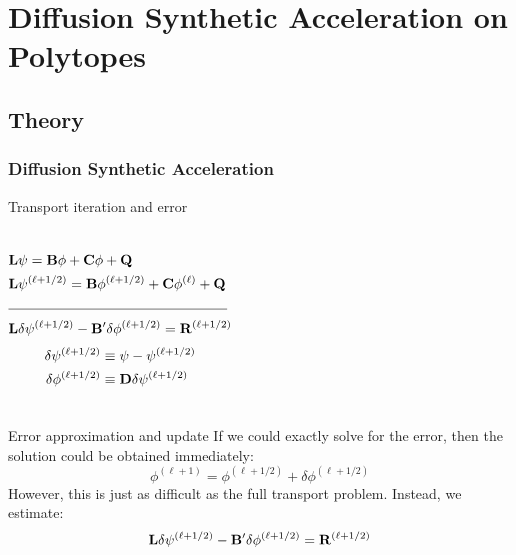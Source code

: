 \documentclass[compress,10pt]{beamer}
\begin{document}
\section[DSA on Polytopes]{Diffusion Synthetic Acceleration on Polytopes}
\subsection{Theory}
\typeout{***********************************************************************************}
\begin{frame}[t]\frametitle{Diffusion Synthetic Acceleration}
\begin{block}{Transport iteration and error}{\small
\begin{columns}
\begin{equation*}
\begin{aligned}
&{\bf L} \psi = {\bf B} \phi + {\bf C} \phi + {\bf Q} \\
&{\bf L} \psi^{(\ell+1/2)} = {\bf B} \phi^{(\ell+1/2)} + {\bf C} \phi^{(\ell)} + {\bf Q} \\
&\noindent\rule{5.5cm}{0.4pt} \\
&{\bf L} \delta \psi^{(\ell+1/2)} - {\bf B}' \delta \phi^{(\ell+1/2)} = {\bf R}^{(\ell+1/2)}
\end{aligned}
\end{equation*}
\begin{equation*}
\begin{aligned}
\delta \psi^{(\ell+1/2)} &\equiv \psi - \psi^{(\ell+1/2)} \\
\delta \phi^{(\ell+1/2)} &\equiv {\bf D} \delta \psi^{(\ell+1/2)}
\end{aligned}
\end{equation*}
\end{columns}}
\end{block}
\begin{block}{Error approximation and update}{\small
If we could exactly solve for the error, then the solution could be obtained immediately:
\begin{equation*}
\phi^{(\ell+1)} = \phi^{(\ell+1/2)} + \delta \phi^{(\ell+1/2)}
\end{equation*}
However, this is just as difficult as the full transport problem. Instead, we estimate:
\begin{equation*}
{\bf L} \delta \psi^{(\ell+1/2)} - {\bf B}' \delta \phi^{(\ell+1/2)} = {\bf R}^{(\ell+1/2)}
\end{equation*}
}\end{block}
\end{frame}
\end{document}
